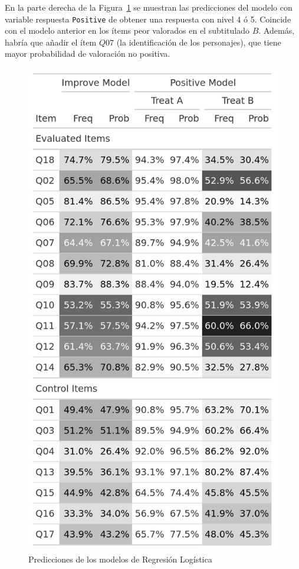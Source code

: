 \documentclass[
  12pt,
  a4paper,
  extrafontsizes,
  onecolumn,
  openright,
  table]{memoir}
\begin{document}
En la parte derecha de la Figura~\ref{fig-or} se muestran las
predicciones del modelo con variable respuesta \texttt{Positive} de
obtener una respuesta con nivel 4 ó 5. Coincide con el modelo anterior
en los ítems peor valorados en el subtitulado \(B\). Además, habría que
añadir el ítem \(Q07\) (la identificación de los personajes), que tiene
mayor probabilidad de valoración no positiva.

\begin{figure}[h]

{\centering \includegraphics[width=\textwidth,height=0.7\textheight]{images/improve.png}

}

\caption{\label{fig-or}Predicciones de los modelos de Regresión
Logística}

\end{figure}
\end{document}
